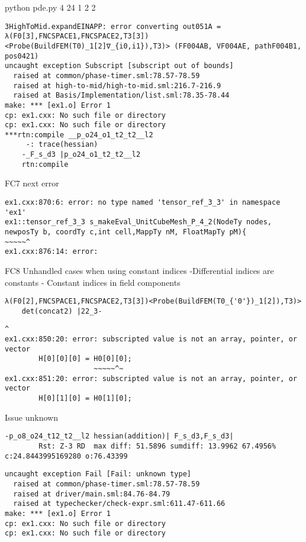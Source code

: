 \begin{description}
 python pde.py 4 24 1 2 2
\begin{lstlisting}[mathescape=true]
3HighToMid.expandEINAPP: error converting out051A = λ(F0[3],FNCSPACE1,FNCSPACE2,T3[3])<Probe(BuildFEM(T0)_1[2]∇_{i0,i1}),T3)> (FF004AB, VF004AE, pathF004B1, pos0421)
uncaught exception Subscript [subscript out of bounds]
  raised at common/phase-timer.sml:78.57-78.59
  raised at high-to-mid/high-to-mid.sml:216.7-216.9
  raised at Basis/Implementation/list.sml:78.35-78.44
make: *** [ex1.o] Error 1
cp: ex1.cxx: No such file or directory
cp: ex1.cxx: No such file or directory
***rtn:compile __p_o24_o1_t2_t2__l2
	 -: trace(hessian)
	-_F_s_d3 |p_o24_o1_t2_t2__l2
	rtn:compile 
	  \end{lstlisting}
\item{FC7}  
	  next error
\begin{lstlisting}[mathescape=true]
	  ex1.cxx:870:6: error: no type named 'tensor_ref_3_3' in namespace 'ex1'
ex1::tensor_ref_3_3 s_makeEval_UnitCubeMesh_P_4_2(NodeTy nodes, newposTy b, coordTy c,int cell,MappTy nM, FloatMapTy pM){
~~~~~^
ex1.cxx:876:14: error:
\end{lstlisting}
\item{FC8}
Unhandled cases when using constant indices
-Differential indices are constants
- Constant indices in field components
\begin{lstlisting}[mathescape=true]
	λ(F0[2],FNCSPACE1,FNCSPACE2,T3[3])<Probe(BuildFEM(T0_{'0'})_1[2]),T3)>
	det(concat2) |22_3- 
	\end{lstlisting}
	
	\item[FC9]
	\begin{lstlisting}[mathescape=true]
                ^
ex1.cxx:850:20: error: subscripted value is not an array, pointer, or vector
        H[0][0][0] = H0[0][0];
                     ~~~~~^~
ex1.cxx:851:20: error: subscripted value is not an array, pointer, or vector
        H[0][1][0] = H0[1][0];
        	\end{lstlisting}
	\item[FT10] 
	Issue unknown       	
   	\begin{lstlisting}[mathescape=true]     	-p_o8_o24_t12_t2__l2 hessian(addition)| F_s_d3,F_s_d3| 
		Rst: Z-3 RD  max diff: 51.5896 sumdiff: 13.9962 67.4956% c:24.8443995169280 o:76.43399
    	\end{lstlisting}
    	
	\item[FC11]
		\begin{lstlisting}[mathescape=true]
uncaught exception Fail [Fail: unknown type]
  raised at common/phase-timer.sml:78.57-78.59
  raised at driver/main.sml:84.76-84.79
  raised at typechecker/check-expr.sml:611.47-611.66
make: *** [ex1.o] Error 1
cp: ex1.cxx: No such file or directory
cp: ex1.cxx: No such file or directory



\end{lstlisting}
\end{description}
